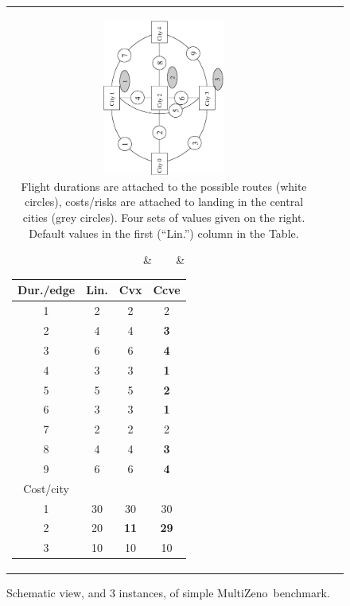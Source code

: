 \documentclass{llncs}
\def\MULTIZENO{{\sc MultiZeno}}
\begin{document}
\begin{figure}[tb]
\begin{tabular}{ccc}
\parbox{7cm}{
 \includegraphics[height=0.5\textwidth,width=4cm,angle=270]{./generiqueMiniMulti.ps} \\
{Flight durations are attached to the possible routes (white circles), costs/risks are attached to landing in the central cities (grey circles). Four sets of values given on the right. Default values in the first (``Lin.'') column in the Table.}
}
& ~~~ &
\begin{tabular}{|c||c|c|c|}
\hline
Dur./edge & Lin. & Cvx & Ccve  \\
\hline 
1 & 2 & 2 & 2\\
2 & 4 & 4 & {\bf 3}\\
3 & 6 & 6 & {\bf 4}\\
4 & 3 & 3 & {\bf 1}\\
5 & 5 & 5 & {\bf 2}\\
6 & 3 & 3 & {\bf 1}\\
7 & 2 & 2 & 2\\
8 & 4 & 4 & {\bf 3}\\
9 & 6 & 6 & {\bf 4}\\
\hline \hline
Cost/city & & & \\
\hline
1 &  30 & 30 & 30\\
2 & 20 & {\bf 11} &{\bf 29}\\
3 & 10 & 10 & 10 \\
\hline
\end{tabular}
\end{tabular}
\caption{Schematic view, and 3 instances, of simple \MULTIZENO\ benchmark.}
\vskip -0.4cm
\label{fig.instance}
\end{figure}
\end{document}
